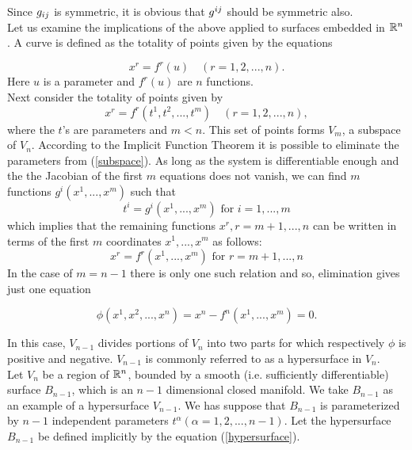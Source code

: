 Since $g_{ij}$ is symmetric, it is obvious that $g^{ij}$ should be symmetric also. \\

Let us examine the implications of the above applied to surfaces embedded in $\mathbb{R}^n$. 
A {\elevenit curve} is defined as the totality of points given by the equations

\begin{equation}
x^r = f^r(u)\quad (r = 1,2,...,n).\label{curve}
\end{equation}
Here $u$ is a parameter and $f^r(u)$ are $n$ functions.\\

Next consider the totality of points given by 
\begin{equation} x^r = f^r(t^1, t^2, ..., t^m)\quad (r= 1,2,...,n),\label{subspace}\end{equation}
where the $t$'s are parameters and $m<n$. This set of points forms $V_m$, a subspace of $V_n$. 
According to the Implicit Function Theorem it is possible to eliminate the parameters from (\ref{subspace}). As long as the system is differentiable enough and the the Jacobian of the first $m$ equations does not vanish, we can 
find $m$ functions $g^i(x^1,...,x^m)$ such that  \begin{equation} t^i = g^i(x^1,...,x^m) \mbox{ for } i = 1,...,m\end{equation}which implies that the remaining functions $x^r, r = m+1,...,n$ can be written in terms of the first $m$ coordinates 
$x^1, ..., x^m$ as follows:
\begin{equation} x^r = f^r(x^1, ..., x^m) \mbox{ for } r = m+1, ..., n\end{equation} In the case of $m=n-1$ there is only one such relation and
so, elimination gives just one equation 

\begin{equation} \phi(x^1, x^2, ..., x^n) = x^n - f^n(x^1,...,x^m) = 0.\label{hypersurface}\end{equation}

In this case, $V_{n-1}$ divides portions of $V_n$ into two parts for which respectively $\phi$ is positive and negative. $V_{n-1}$ is commonly referred to as a {\elevenit hypersurface} in $V_n$.\\

Let $V_{n}$ be a region of $\mathbb{R}^n$, bounded by a smooth (i.e. sufficiently differentiable) surface $B_{n-1}$, which is an $n-1$ dimensional closed manifold. We take $B_{n-1}$ as an example of a hypersurface $V_{n-1}$.
We has suppose that $B_{n-1}$ is parameterized by $n-1$ independent parameters $t^\alpha (\alpha = 1,2,...,n-1)$. Let the hypersurface $B_{n-1}$ be defined implicitly by the equation (\ref{hypersurface}).\\

